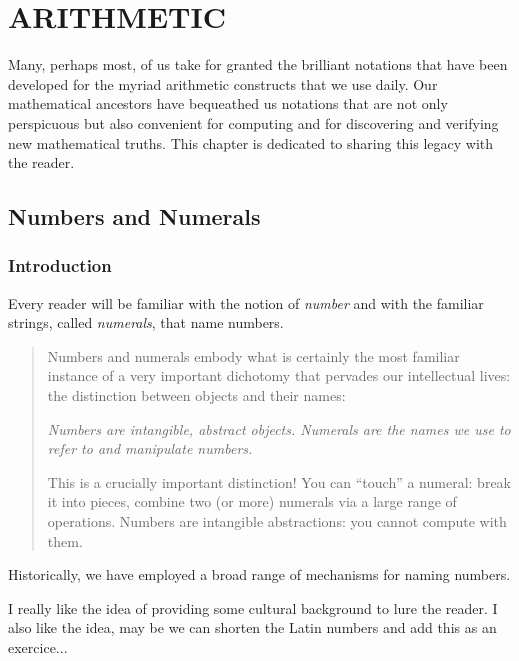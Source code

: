 
\chapter{ARITHMETIC}
\label{ch:arithmetic}

Many, perhaps most, of us take for granted the brilliant notations
that have been developed for the myriad arithmetic constructs that we
use daily.  Our mathematical ancestors have bequeathed us notations
that are not only perspicuous but also convenient for computing and
for discovering and verifying new mathematical truths.  This chapter
is dedicated to sharing this legacy with the reader.

\section{Numbers and Numerals}
\label{sec:numbers-numerals}

\subsection{Introduction}

Every reader will be familiar with the notion of {\it number} and with
the familiar strings, called {\it numerals}, that name numbers.
\begin{quote}
Numbers and numerals embody what is certainly the most familiar
instance of a very important dichotomy that pervades our intellectual
lives: the distinction between objects and their names:

{\em Numbers are intangible, abstract objects.  Numerals are the names
  we use to refer to and manipulate numbers.}

This is a crucially important distinction!  You can ``touch'' a
numeral: break it into pieces, combine two (or more) numerals via a
large range of operations.  Numbers are intangible abstractions: you
cannot compute with them.
\end{quote}
Historically, we have employed a broad range of mechanisms for naming
numbers.

{\Arny I really like the idea of providing some cultural background to
  lure the reader.  }
{\Denis I also like the idea, may be we can shorten the Latin numbers and add this as an exercice...}


